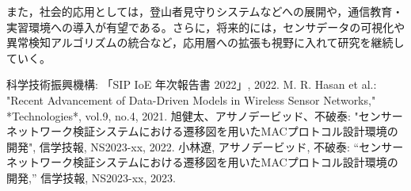 \documentclass[technicalreport]{ieicej}
\begin{document}
また，社会的応用としては，登山者見守りシステムなどへの展開や，通信教育・実習環境への導入が有望である。さらに，将来的には，センサデータの可視化や異常検知アルゴリズムの統合など，応用層への拡張も視野に入れて研究を継続していく。


\baselineskip
%
%

\begin{thebibliography}{99}
 科学技術振興機構: 「SIP IoE 年次報告書 2022」, 2022.
 M. R. Hasan et al.: "Recent Advancement of Data-Driven Models in Wireless Sensor Networks," *Technologies*, vol.9, no.4, 2021.
 旭健太、アサノデービッド、不破泰: "センサーネットワーク検証システムにおける遷移図を用いたMACプロトコル設計環境の開発", 信学技報, NS2023-xx, 2022.
 小林遼, アサノデービッド, 不破泰:
“センサーネットワーク検証システムにおける遷移図を用いたMACプロトコル設計環境の開発,”
信学技報, NS2023-xx, 2023.

\end{thebibliography}
\end{document}
